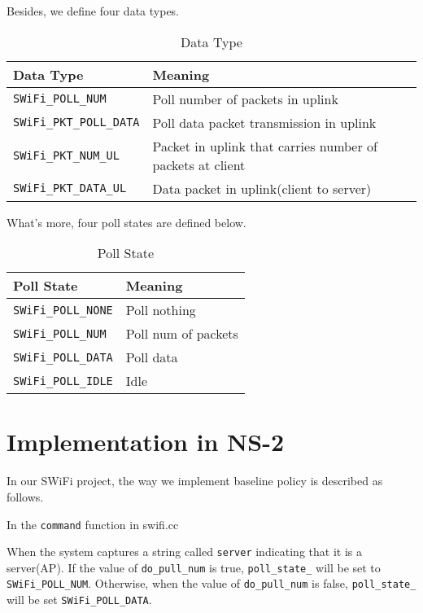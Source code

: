 \documentclass{article}
\begin{document}
Besides, we define four data types. 
\begin{table}[h!]
   \centering
   \caption{Data Type}
   \label{tab:table3}
   \begin{tabular}{| l | l |}
      \hline
      Data Type  &  Meaning\\ \hline
      \lstinline |SWiFi_POLL_NUM| & Poll number of packets in uplink\\ \hline 
      \lstinline |SWiFi_PKT_POLL_DATA|  & Poll data packet transmission in uplink\\ \hline 
      \lstinline |SWiFi_PKT_NUM_UL| & Packet in uplink that carries number of packets at client\\ \hline 
      \lstinline |SWiFi_PKT_DATA_UL| & Data packet in uplink(client to server)\\  
     \hline
   \end{tabular}
\end{table}
 
What's more, four poll states are defined below. 
\begin{table}[h!]
   \centering
   \caption{Poll State}
   \label{tab:table4}
   \begin{tabular}{| l | l |}
      \hline
      Poll State  &  Meaning\\ \hline
      \lstinline |SWiFi_POLL_NONE| & Poll nothing\\ \hline 
      \lstinline |SWiFi_POLL_NUM|  & Poll num of packets\\ \hline 
      \lstinline |SWiFi_POLL_DATA| & Poll data\\ \hline 
      \lstinline |SWiFi_POLL_IDLE| & Idle\\  
     \hline
   \end{tabular}
\end{table}
     

\section{Implementation in NS-2}
\label{section: ns2}
In our SWiFi project, the way we implement baseline policy is described as follows. 

In the \lstinline |command| function in swifi.cc

When the system captures a string called  \lstinline |server| indicating that it is a server(AP). If the value of  \lstinline |do_pull_num|  is true,  \lstinline |poll_state_|  will be set to  \lstinline |SWiFi_POLL_NUM|. Otherwise, when the value of  \lstinline |do_pull_num|  is false,   \lstinline |poll_state_|  will be set  \lstinline |SWiFi_POLL_DATA|. 
\end{document}
